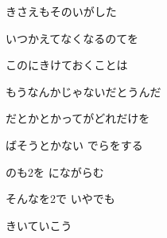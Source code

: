 \documentclass[14pt]{ltjsarticle}
\begin{document}
{  きさえもそのいがした
  \jisho{}

\item
  
いつかえてなくなるのてを
  \jisho{}

  
このにきけておくことは
  \jisho{}

  
もうなんかじゃないだとうんだ
  \jisho{}

\item
  だとかとかってがどれだけを
  \jisho{}

  ばそうとかない でらをする
  \jisho{}

  のも2を にながらむ
  \jisho{}

  
そんなを2で いやでも
  \jisho{}

\item
  きいていこう
  \jisho{}

  
}
\end{document}
